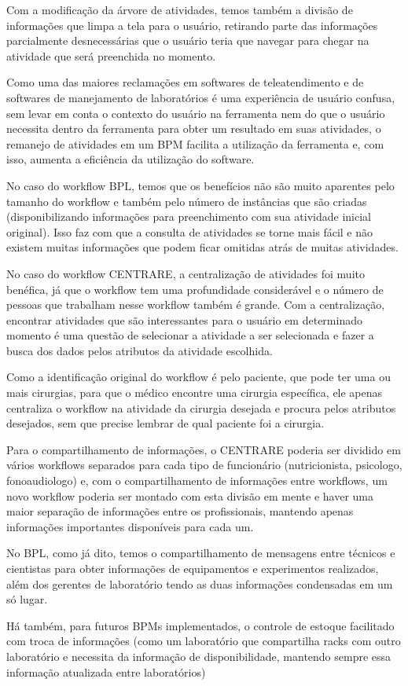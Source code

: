 Com a modificação da árvore de atividades, temos também a divisão de informações que limpa a tela para o usuário, retirando parte das informações parcialmente desnecessárias que o usuário teria que navegar para chegar na atividade que será preenchida no momento.

Como uma das maiores reclamações em softwares de teleatendimento e de softwares de manejamento de laboratórios é uma experiência de usuário confusa, sem levar em conta o contexto do usuário na ferramenta nem do que o usuário necessita dentro da ferramenta para obter um resultado em suas atividades, o remanejo de atividades em um BPM facilita a utilização da ferramenta e, com isso, aumenta a eficiência da utilização do software.

No caso do workflow BPL, temos que os benefícios não são muito aparentes pelo tamanho do workflow e também pelo número de instâncias que são criadas (disponibilizando informações para preenchimento com sua atividade inicial original). Isso faz com que a consulta de atividades se torne mais fácil e não existem muitas informações que podem ficar omitidas atrás de muitas atividades.

No caso do workflow CENTRARE, a centralização de atividades foi muito benéfica, já que o workflow tem uma profundidade considerável e o número de pessoas que trabalham nesse workflow também é grande. Com a centralização, encontrar atividades que são interessantes para o usuário em determinado momento é uma questão de selecionar a atividade a ser selecionada e fazer a busca dos dados pelos atributos da atividade escolhida.

Como a identificação original do workflow é pelo paciente, que pode ter uma ou mais cirurgias, para que o médico encontre uma cirurgia específica, ele apenas centraliza o workflow na atividade da cirurgia desejada e procura pelos atributos desejados, sem que precise lembrar de qual paciente foi a cirurgia.

Para o compartilhamento de informações, o CENTRARE poderia ser dividido em vários workflows separados para cada tipo de funcionário (nutricionista, psicologo, fonoaudiologo) e, com o compartilhamento de informações entre workflows, um novo workflow poderia ser montado com esta divisão em mente e haver uma maior separação de informações entre os profissionais, mantendo apenas informações importantes disponíveis para cada um.

No BPL, como já dito, temos o compartilhamento de mensagens entre técnicos e cientistas para obter informações de equipamentos e experimentos realizados, além dos gerentes de laboratório tendo as duas informações condensadas em um só lugar.

Há também, para futuros BPMs implementados, o controle de estoque facilitado com troca de informações (como um laboratório que compartilha racks com outro laboratório e necessita da informação de disponibilidade, mantendo sempre essa informação atualizada entre laboratórios)